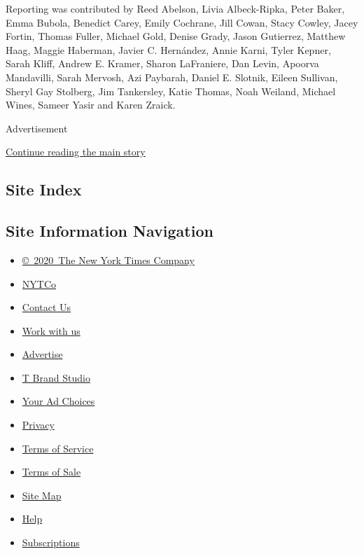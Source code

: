 Reporting was contributed by Reed Abelson, Livia Albeck-Ripka, Peter
Baker, Emma Bubola, Benedict Carey, Emily Cochrane, Jill Cowan, Stacy
Cowley, Jacey Fortin, Thomas Fuller, Michael Gold, Denise Grady, Jason
Gutierrez, Matthew Haag, Maggie Haberman, Javier C. Hernández, Annie
Karni, Tyler Kepner, Sarah Kliff, Andrew E. Kramer, Sharon LaFraniere,
Dan Levin, Apoorva Mandavilli, Sarah Mervosh, Azi Paybarah, Daniel E.
Slotnik, Eileen Sullivan, Sheryl Gay Stolberg, Jim Tankersley, Katie
Thomas, Noah Weiland, Michael Wines, Sameer Yasir and Karen Zraick.

Advertisement

\protect\hyperlink{after-bottom}{Continue reading the main story}

\hypertarget{site-index}{%
\subsection{Site Index}\label{site-index}}

\hypertarget{site-information-navigation}{%
\subsection{Site Information
Navigation}\label{site-information-navigation}}

\begin{itemize}
\tightlist
\item
  \href{https://help.nytimes.com/hc/en-us/articles/115014792127-Copyright-notice}{©~2020~The
  New York Times Company}
\end{itemize}

\begin{itemize}
\tightlist
\item
  \href{https://www.nytco.com/}{NYTCo}
\item
  \href{https://help.nytimes.com/hc/en-us/articles/115015385887-Contact-Us}{Contact
  Us}
\item
  \href{https://www.nytco.com/careers/}{Work with us}
\item
  \href{https://nytmediakit.com/}{Advertise}
\item
  \href{http://www.tbrandstudio.com/}{T Brand Studio}
\item
  \href{https://www.nytimes.com/privacy/cookie-policy\#how-do-i-manage-trackers}{Your
  Ad Choices}
\item
  \href{https://www.nytimes.com/privacy}{Privacy}
\item
  \href{https://help.nytimes.com/hc/en-us/articles/115014893428-Terms-of-service}{Terms
  of Service}
\item
  \href{https://help.nytimes.com/hc/en-us/articles/115014893968-Terms-of-sale}{Terms
  of Sale}
\item
  \href{https://spiderbites.nytimes.com}{Site Map}
\item
  \href{https://help.nytimes.com/hc/en-us}{Help}
\item
  \href{https://www.nytimes.com/subscription?campaignId=37WXW}{Subscriptions}
\end{itemize}
